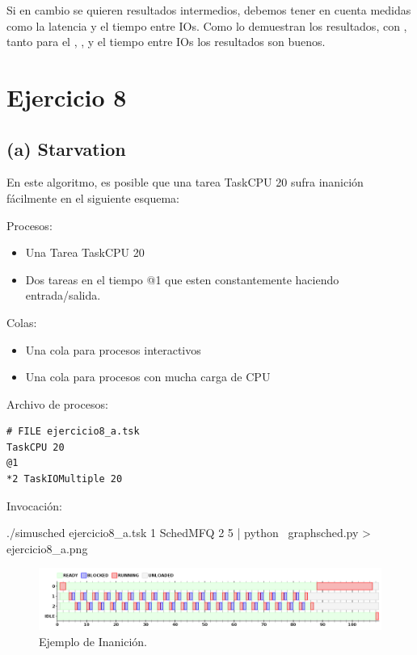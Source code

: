 Si en cambio se quieren resultados intermedios, debemos tener en cuenta medidas como la latencia y el tiempo entre IOs. Como lo demuestran los resultados, con , tanto para el \ta, \wt, \latencia y el tiempo entre IOs los resultados son buenos.

\newpage

\section{Ejercicio 8}

\subsection{(a) Starvation}

En este algoritmo, es posible que una tarea TaskCPU 20 sufra inanici\'on f\'acilmente en el siguiente esquema:

Procesos:
\begin{itemize}
 \item Una Tarea TaskCPU 20
 \item Dos tareas en el tiempo @1 que esten constantemente haciendo entrada/salida.
\end{itemize}

Colas:
\begin{itemize}
 \item Una cola para procesos interactivos
 \item Una cola para procesos con mucha carga de CPU
\end{itemize}

Archivo de procesos:

\begin{framed}
\begin{verbatim}
# FILE ejercicio8_a.tsk
TaskCPU 20
@1
*2 TaskIOMultiple 20
\end{verbatim}
\end{framed}

Invocaci\'on:

\begin{framed}
\begin{verbatimtab}
./simusched ejercicio8_a.tsk 1 SchedMFQ 2 5 | python \
    graphsched.py > ejercicio8_a.png
\end{verbatimtab}
\end{framed}

\begin{figure}[H]
  \caption{Ejemplo de Inanici\'on.}
  \centering
    \includegraphics[width=1\textwidth]{img/ejercicio8_a.png}
\end{figure}

